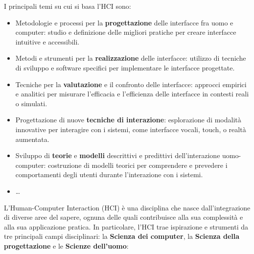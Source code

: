 \documentclass{report}
\begin{document}
	I principali temi su cui si basa l'HCI sono:

	\begin{itemize}
		\item Metodologie e processi per la \textbf{progettazione} delle interfacce fra uomo e computer: studio e definizione delle migliori pratiche per creare interfacce intuitive e accessibili.

		\item Metodi e strumenti per la \textbf{realizzazione} delle interfacce: utilizzo di tecniche di sviluppo e software specifici per implementare le interfacce progettate.

		\item Tecniche per la \textbf{valutazione} e il confronto delle interfacce: approcci empirici e analitici per misurare l'efficacia e l'efficienza delle interfacce in contesti reali o simulati.

		\item Progettazione di nuove \textbf{tecniche di interazione}: esplorazione di modalità innovative per interagire con i sistemi, come interfacce vocali, touch, o realtà aumentata.

		\item Sviluppo di \textbf{teorie} e \textbf{modelli} descrittivi e predittivi dell'interazione uomo-computer: costruzione di modelli teorici per comprendere e prevedere i comportamenti degli utenti durante l'interazione con i sistemi.

		\item \ldots
	\end{itemize}
	L'Human-Computer Interaction (HCI) è una disciplina che nasce dall'integrazione di diverse aree del sapere, ognuna delle quali contribuisce alla sua complessità e alla sua applicazione pratica. In particolare, l'HCI trae ispirazione e strumenti da tre principali campi disciplinari: la \textbf{Scienza dei computer}, la \textbf{Scienza della progettazione} e le \textbf{Scienze dell'uomo}:
\end{document}
